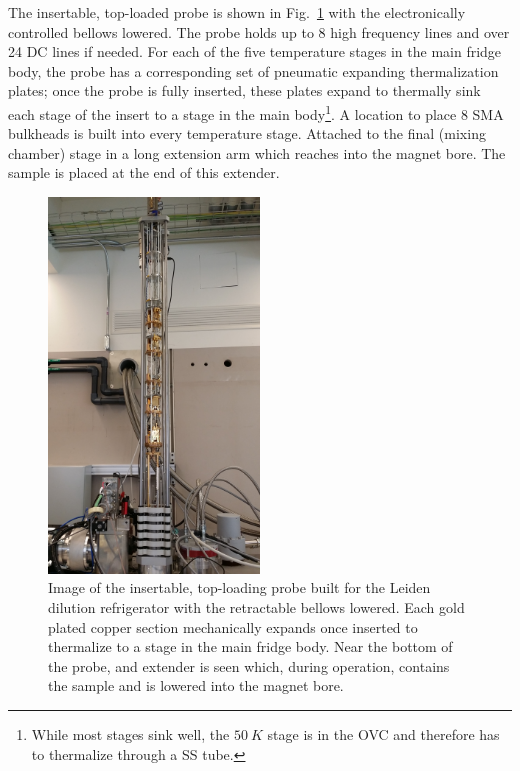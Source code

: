 The insertable, top-loaded probe is shown in Fig.~\ref{Fig:Appen:Leiden_bellows_open} with the electronically controlled bellows lowered. The probe holds up to 8 high frequency lines and over 24 DC lines if needed. For each of the five temperature stages in the main fridge body, the probe has a corresponding set of pneumatic expanding thermalization plates; once the probe is fully inserted, these plates expand to thermally sink each stage of the insert to a stage in the main body\footnote{While most stages sink well, the $50~K$ stage is in the OVC and therefore has to thermalize through a SS tube.}. A location to place 8 SMA bulkheads is built into every temperature stage. Attached to the final (mixing chamber) stage in a long extension arm which reaches into the magnet bore. The sample is placed at the end of this extender. 
\begin{figure}
\centering
\includegraphics[angle=-90,width = 0.5\textwidth]{figures/appendix/cryostats/Leiden_bellows_open.jpg}
\caption{Image of the insertable, top-loading probe built for the Leiden dilution refrigerator with the retractable bellows lowered. Each gold plated copper section mechanically expands once inserted to thermalize to a stage in the main fridge body. Near the bottom of the probe, and extender is seen which, during operation, contains the sample and is lowered into the magnet bore.}
\label{Fig:Appen:Leiden_bellows_open}
\end{figure}

